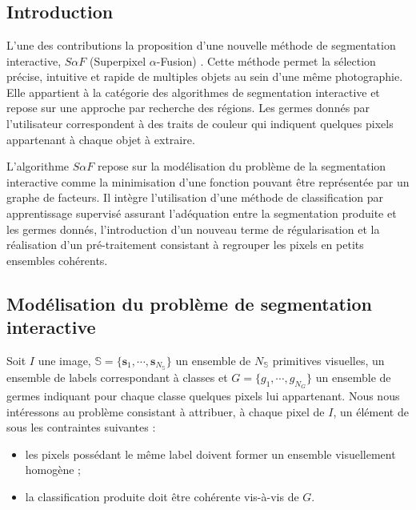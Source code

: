 \chapter{}

\section{Introduction}
L'une des  contributions  la proposition d'une nouvelle méthode de segmentation interactive, $S \alpha F$ (Superpixel $\alpha$-Fusion) \cite{mathieu2016segmentation, mathieu2017jei}. Cette méthode permet la sélection précise, intuitive et rapide de multiples objets au sein d'une même photographie. Elle appartient à la catégorie des algorithmes de segmentation interactive  et repose sur une approche par recherche des régions. Les germes donnés par l'utilisateur correspondent à des traits de couleur qui indiquent quelques pixels appartenant à chaque objet à extraire. 

L'algorithme $S \alpha F$ repose sur la modélisation du problème de la segmentation interactive comme la minimisation d'une fonction  pouvant être représentée par un graphe de facteurs. Il intègre l'utilisation d'une méthode de classification par apprentissage supervisé assurant l'adéquation entre la segmentation produite et les germes donnés, l'introduction d'un nouveau terme de régularisation et la réalisation d'un pré-traitement consistant à regrouper les pixels en petits ensembles cohérents. 

\section{Modélisation du problème de segmentation interactive }

Soit $I$ une image, $\mathbb{S}=\lbrace \mathbf{s}_{1}, \cdots, \mathbf{s}_{N_{\mathbb{S}}} \rbrace$ un ensemble de $N_{\mathbb{S}}$ primitives visuelles,  un ensemble de  labels correspondant à  classes et $G=\lbrace g_{1}, \cdots, g_{N_{G}} \rbrace$ un ensemble de germes indiquant pour chaque classe quelques pixels lui appartenant. Nous nous intéressons au problème consistant à attribuer, à chaque pixel de $I$, un élément de \modif{$\Lambda$} sous les contraintes suivantes :
\begin{itemize}
\item les pixels possédant le même label doivent former un ensemble visuellement homogène ;
\item la classification produite doit être cohérente vis-à-vis de $G$.
\end{itemize}

